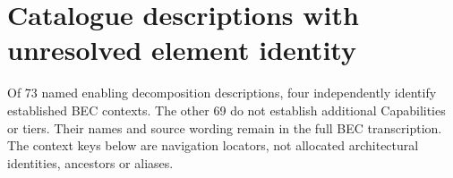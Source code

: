 \chapter{Catalogue descriptions with unresolved element identity}\label{model:contexts}
Of 73 named enabling decomposition descriptions, four independently identify established BEC contexts. The other 69 do not establish additional Capabilities or tiers. Their names and source wording remain in the full BEC transcription. The context keys below are navigation locators, not allocated architectural identities, ancestors or aliases.

\begingroup\small\setlength{\TableWidth}{\dimexpr\linewidth-6\tabcolsep-4\arrayrulewidth\relax}

